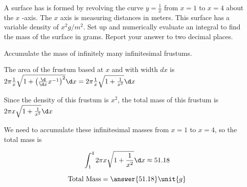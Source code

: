 \documentclass{ximera}
\author{Steven Gubkin}
\begin{document}
\begin{exercise}


A surface has is formed by revolving the curve $y = \frac{1}{x}$ from $x=1$ to $x=4$ about the $x$ -axis.  The $x$ axis is measuring distances in meters.  This surface has a variable density of $x^2 \unit{g}/\unit{m}^2$.  Set up and numerically evaluate an integral to find the mass of the surface in grams.  Report your answer to two decimal places.

\begin{hint}
	Accumulate the mass of infinitely many infinitesimal frustums.
\end{hint}

\begin{hint}
	The area of the frustum based at $x$ and with width $dx$ is $2\pi \frac{1}{x} \sqrt{1+\left(\frac{\d}{\d x} x^{-1}\right)^2} \d x = 2\pi \frac{1}{x} \sqrt{1+\frac{1}{x^2}} \d x$
\end{hint}

\begin{hint}
	Since the density of this frustum is $x^2$, the total mass of this frustum is $2 \pi x \sqrt{1+\frac{1}{x^2}} \d x$
\end{hint}

\begin{hint}
	We need to accumulate these infinitesimal masses from $x=1$ to $x=4$, so the total mass is
	
	\[
	\int_1^4 2 \pi x \sqrt{1+\frac{1}{x^2}} \d x \approx 51.18
	\]
\end{hint}

\begin{prompt}
	\[
	\textrm{Total Mass} = \answer{51.18} \unit{g}
	\]
\end{prompt}
\end{exercise}
\end{document}

